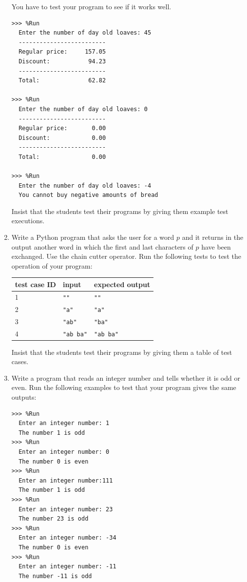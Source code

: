 \documentclass[
  fontsize=10pt,
  a4paper,
]{scrartcl}
\newenvironment{howTILEd}%
  {\begin{mdframed}[skipabove=10pt,skipbelow=10pt,backgroundcolor=pink!40]}%
  {\end{mdframed}}
\begin{document}
\begin{enumerate}
You have to test your program to see if it works well.

\begin{small}
\begin{Verbatim}[frame=single, label={\em examples of test executions}]
>>> %Run 
  Enter the number of day old loaves: 45
  -------------------------
  Regular price:     157.05
  Discount:           94.23
  -------------------------
  Total:              62.82

>>> %Run 
  Enter the number of day old loaves: 0
  -------------------------
  Regular price:       0.00
  Discount:            0.00
  -------------------------
  Total:               0.00

>>> %Run 
  Enter the number of day old loaves: -4
  You cannot buy negative amounts of bread
\end{Verbatim}
\end{small}

\begin{howTILEd}
Insist that the students test their programs by giving them example test executions.
\end{howTILEd}


\item Write a Python program that asks the user for a word $p$ and
it returns in the output another word in which the first and last characters of $p$ have been exchanged. Use the chain cutter operator. Run the following tests to test the operation of your program:

\begin{tabular}{|l|l|l|}
\hline
test case ID & input & expected output  \\ 
\hline\hline
1 & \verb+""+ & \verb+""+ \\
2 & \verb+"a"+ & \verb+"a"+\\
3 & \verb+"ab"+ & \verb+"ba"+\\
4 & \verb+"ab ba"+ & \verb+"ab ba"+\\
\hline
\end{tabular}


\begin{howTILEd}
Insist that the students test their programs by giving them a table of test cases.
\end{howTILEd}

\item Write a program that reads an integer number and tells whether it is odd or even. Run the following examples to test that your program gives the same outputs:

\begin{small}
\begin{Verbatim}[frame=single, label={\em examples of test executions}]
>>> %Run 
  Enter an integer number: 1
  The number 1 is odd
>>> %Run 
  Enter an integer number: 0
  The number 0 is even
>>> %Run 
  Enter an integer number:111
  The number 1 is odd
>>> %Run 
  Enter an integer number: 23
  The number 23 is odd
>>> %Run 
  Enter an integer number: -34
  The number 0 is even
>>> %Run 
  Enter an integer number: -11
  The number -11 is odd
\end{Verbatim}
\end{small}


\end{enumerate}
\end{document}
